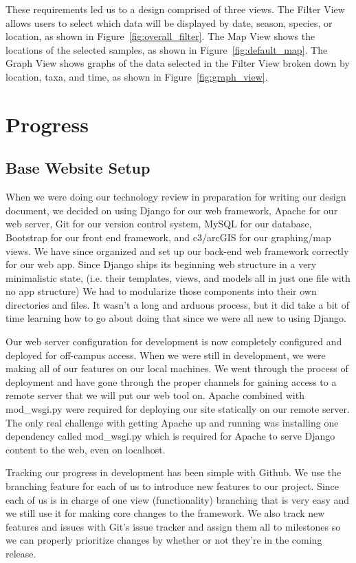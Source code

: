 \documentclass[10pt,draftclsnofoot,onecolumn]{IEEEtran}
\begin{document}
These requirements led us to a design comprised of three views.
The Filter View allows users to select which data will be displayed by date, season, species, or location, as shown in Figure~\ref{fig:overall_filter}.
The Map View shows the locations of the selected samples, as shown in Figure~\ref{fig:default_map}.
The Graph View shows graphs of the data selected in the Filter View broken down by location, taxa, and time, as shown in Figure~\ref{fig:graph_view}.


\section{Progress}

\subsection{Base Website Setup} %
When we were doing our technology review in preparation for writing our design document, we decided on using Django for our web framework, Apache for our web server, Git for our version control system, MySQL for our database, Bootstrap for our front end framework, and c3/arcGIS for our graphing/map views.
We have since organized and set up our back-end web framework correctly for our web app.
Since Django ships its beginning web structure in a very minimalistic state, (i.e. their templates, views, and models all in just one file with no app structure) We had to modularize those components into their own directories and files.
It wasn’t a long and arduous process, but it did take a bit of time learning how to go about doing that since we were all new to using Django.

Our web server configuration for development is now completely configured and deployed for off-campus access.
When we were still in development, we were making all of our features on our local machines.
We went through the process of deployment and have gone through the proper channels for gaining access to a remote server that we will put our web tool on.
Apache combined with mod\_wsgi.py were required for deploying our site statically on our remote server.
The only real challenge with getting Apache up and running was installing one dependency called mod\_wsgi.py which is required for Apache to serve Django content to the web, even on localhost.

Tracking our progress in development has been simple with Github.
We use the branching feature for each of us to introduce new features to our project.
Since each of us is in charge of one view (functionality) branching that is very easy and we still use it for making core changes to the framework.
We also track new features and issues with Git’s issue tracker and assign them all to milestones so we can properly prioritize changes by whether or not they’re in the coming release.
\end{document}
